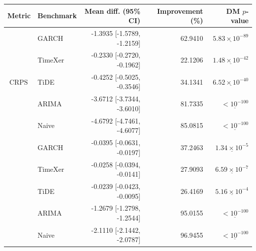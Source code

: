 \begin{tabular}{llrrr}
\toprule
Metric & Benchmark & Mean diff. (95\% CI) & Improvement (\%) & DM $p$-value \\
\midrule
\multirow{5}{*}{$\operatorname{CRPS}$}
 & GARCH & -1.3935 [-1.5789, -1.2159] & 62.9410 & $\underline{5.83 \times 10^{-89}}$ \\
 & TimeXer & -0.2330 [-0.2720, -0.1962] & 22.1206 & $\underline{1.48 \times 10^{-42}}$ \\
 & TiDE & -0.4252 [-0.5025, -0.3546] & 34.1341 & $\underline{6.52 \times 10^{-40}}$ \\
 & ARIMA & -3.6712 [-3.7344, -3.6010] & 81.7335 & $\underline{< 10^{-100}}$ \\
 & Naive & -4.6792 [-4.7461, -4.6077] & 85.0815 & $\underline{< 10^{-100}}$ \\
\addlinespace \midrule
\multirow{5}{*}{$\operatorname{twCRPS}$}
 & GARCH & -0.0395 [-0.0631, -0.0197] & 37.2463 & $\underline{1.34 \times 10^{-5}}$ \\
 & TimeXer & -0.0258 [-0.0394, -0.0141] & 27.9093 & $\underline{6.59 \times 10^{-7}}$ \\
 & TiDE & -0.0239 [-0.0423, -0.0095] & 26.4169 & $\underline{5.16 \times 10^{-4}}$ \\
 & ARIMA & -1.2679 [-1.2798, -1.2544] & 95.0155 & $\underline{< 10^{-100}}$ \\
 & Naive & -2.1110 [-2.1442, -2.0787] & 96.9455 & $\underline{< 10^{-100}}$ \\
\bottomrule
\end{tabular}